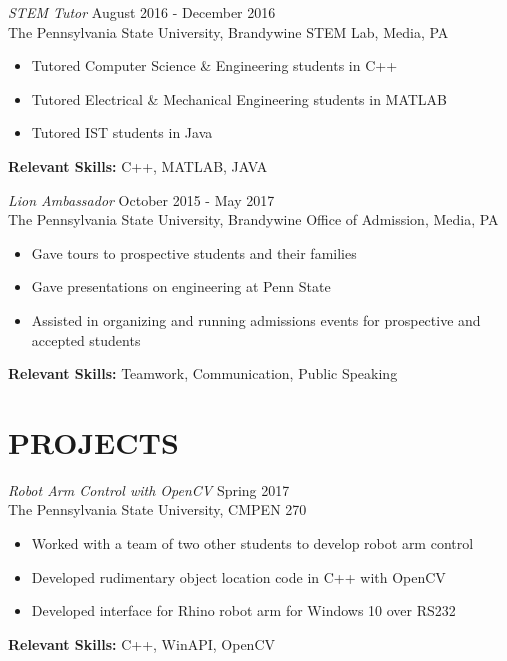 \documentclass[line,margin]{res}
\begin{document}
\begin{resume}
		{\sl STEM Tutor} \hfill August 2016 - December 2016 \\
		The Pennsylvania State University, Brandywine STEM Lab, Media, PA
		\begin{itemize}  \itemsep -2pt
			\item Tutored Computer Science \& Engineering students in C++
			\item Tutored Electrical \& Mechanical Engineering students in MATLAB
			\item Tutored IST students in Java
			\vspace*{-\baselineskip}		
		\end{itemize}
		\textbf{Relevant Skills:} C++, MATLAB, JAVA
		\newline
		
		{\sl Lion Ambassador} \hfill October 2015 - May 2017 \\
		The Pennsylvania State University, Brandywine Office of Admission, Media, PA
		\begin{itemize}  \itemsep -2pt
			\item Gave tours to prospective students and their families
			\item Gave presentations on engineering at Penn State
			\item Assisted in organizing and running admissions events for prospective and accepted students
			\vspace*{-\baselineskip}		
		\end{itemize}
		\textbf{Relevant Skills:} Teamwork, Communication, Public Speaking
		\newline
			
		\newpage
		\section{PROJECTS}
		{\sl Robot Arm Control with OpenCV} \hfill Spring 2017\\
		The Pennsylvania State University, CMPEN 270
		\begin{itemize}  \itemsep -2pt
			\item Worked with a team of two other students to develop robot arm control
			\item Developed rudimentary object location code in C++ with OpenCV
			\item Developed interface for Rhino robot arm for Windows 10 over RS232 
			\vspace*{-\baselineskip}		
		\end{itemize}
		\textbf{Relevant Skills:} C++, WinAPI, OpenCV
		\newline
		

\end{resume}
\end{document}
